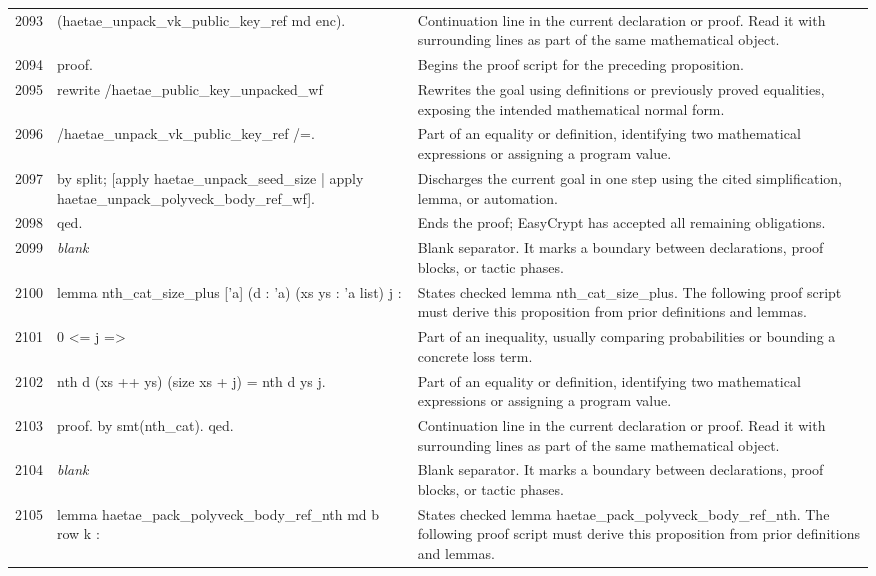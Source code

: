 \documentclass[10pt]{article}
\begin{document}
\begin{longtable}{r L{0.53\textwidth} L{0.37\textwidth}}
2093 & {\ttfamily\scriptsize     (haetae\_unpack\_vk\_public\_key\_ref md enc).} & Continuation line in the current declaration or proof.  Read it with surrounding lines as part of the same mathematical object. \\
2094 & {\ttfamily\scriptsize proof.} & Begins the proof script for the preceding proposition. \\
2095 & {\ttfamily\scriptsize rewrite /haetae\_public\_key\_unpacked\_wf} & Rewrites the goal using definitions or previously proved equalities, exposing the intended mathematical normal form. \\
2096 & {\ttfamily\scriptsize         /haetae\_unpack\_vk\_public\_key\_ref /=.} & Part of an equality or definition, identifying two mathematical expressions or assigning a program value. \\
2097 & {\ttfamily\scriptsize by split; [apply haetae\_unpack\_seed\_size | apply haetae\_unpack\_polyveck\_body\_ref\_wf].} & Discharges the current goal in one step using the cited simplification, lemma, or automation. \\
2098 & {\ttfamily\scriptsize qed.} & Ends the proof; EasyCrypt has accepted all remaining obligations. \\
2099 & {\ttfamily\scriptsize \emph{blank}} & Blank separator.  It marks a boundary between declarations, proof blocks, or tactic phases. \\
2100 & {\ttfamily\scriptsize lemma nth\_cat\_size\_plus ['a] (d : 'a) (xs ys : 'a list) j :} & States checked lemma nth\_cat\_size\_plus.  The following proof script must derive this proposition from prior definitions and lemmas. \\
2101 & {\ttfamily\scriptsize   0 <= j =>} & Part of an inequality, usually comparing probabilities or bounding a concrete loss term. \\
2102 & {\ttfamily\scriptsize   nth d (xs ++ ys) (size xs + j) = nth d ys j.} & Part of an equality or definition, identifying two mathematical expressions or assigning a program value. \\
2103 & {\ttfamily\scriptsize proof. by smt(nth\_cat). qed.} & Continuation line in the current declaration or proof.  Read it with surrounding lines as part of the same mathematical object. \\
2104 & {\ttfamily\scriptsize \emph{blank}} & Blank separator.  It marks a boundary between declarations, proof blocks, or tactic phases. \\
2105 & {\ttfamily\scriptsize lemma haetae\_pack\_polyveck\_body\_ref\_nth md b row k :} & States checked lemma haetae\_pack\_polyveck\_body\_ref\_nth.  The following proof script must derive this proposition from prior definitions and lemmas. \\

\end{longtable}
\end{document}

